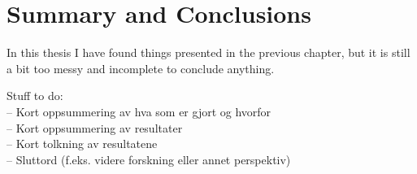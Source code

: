 \chapter{Summary and Conclusions}
\label{chap:summaryconclusions}
In this thesis I have found things presented in the previous chapter, but it is still a bit too messy and incomplete to conclude anything.

Stuff to do:\\
-- Kort oppsummering av hva som er gjort og hvorfor\\
-- Kort oppsummering av resultater\\
-- Kort tolkning av resultatene\\
-- Sluttord (f.eks. videre forskning eller annet perspektiv)